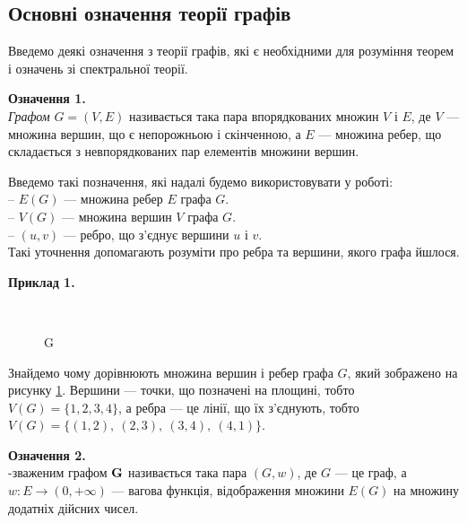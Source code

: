 \subsection{Основні означення теорії графів}

Введемо деякі означення з теорії графів, які є необхідними для розуміння теорем і означень зі спектральної теорії.

 \textbf{Означення 1.}\\ 
 \textit{Графом} $G =(V,E)$ називається така пара впорядкованих множин $V$ і $E$,  де $V$ --- множина вершин, що є непорожньою і скінченною, а $E$ --- множина ребер, що складається з невпорядкованих пар елементів множини вершин.
 
Введемо такі позначення, які надалі будемо використовувати у роботі:\\
-- $E(G)$ --- множина ребер $E$ графа $G$.\\
-- $V(G)$ --- множина вершин $V$ графа $G$.\\
-- $(u,v)$ --- ребро, що з'єднує вершини $u$ і $v$.\\
Такі уточнення допомагають розуміти про ребра та вершини, якого графа йшлося.

\textbf{Приклад 1.}
\begin{figure}[H]
    \centering
    \\
    \caption{G}
    \label{ris1:image}
\end{figure}
Знайдемо чому дорівнюють множина вершин і ребер графа $G$, який зображено на рисунку \ref{ris1:image}. Вершини --- точки, що позначені на площині, тобто $V(G) = \{1,2,3,4\}$,  а ребра --- це лінії, що їх з'єднують, тобто  $V(G) = \{(1,2),\ (2,3),\ (3,4),\ (4,1)\}$.



 \vskip 1pt  
 \textbf{Означення 2.}\\
  {-зваженим графом $\bf G$} називається така пара $(G, w)$, де $G$ --- це граф, а $w: E\rightarrow (0, +\infty)$ --- вагова функція, відображення множини $E(G)$ на множину додатніх дійсних чисел.
 
